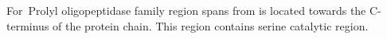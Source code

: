 For~Prolyl oligopeptidase family region spans from is located towards the C-terminus of the protein chain. This region contains serine catalytic region.  